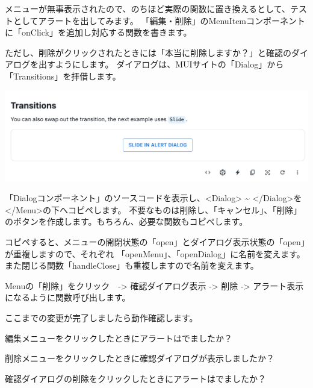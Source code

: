 メニューが無事表示されたので、のちほど実際の関数に置き換えるとして、テストとしてアラートを出してみます。
「編集・削除」のMenuItemコンポーネントに「onClick」を追加し対応する関数を書きます。

\vspace*{\baselineskip}

ただし、削除がクリックされたときには「本当に削除しますか？」と確認のダイアログを出すようにします。
ダイアログは、MUIサイトの「Dialog」から「Transitions」を拝借します。

\begin{reviewimage}[H]%
\includegraphics[width=0.6\maxwidth]{./images/03-todo-with-react/mui013-card-deleteDialog.png}%
\label{image:03-todo-with-react:mui013-card-deleteDialog}
\end{reviewimage}
\vspace*{\baselineskip}

「Dialogコンポーネント」のソースコードを表示し、\textless{}Dialog\textgreater{} \textasciitilde{} \textless{}/Dialog\textgreater{}を\textless{}/Menu\textgreater{}の下へコピペします。
不要なものは削除し、「キャンセル」、「削除」のボタンを作成します。もちろん、必要な関数もコピペします。

\vspace*{\baselineskip}

コピペすると、メニューの開閉状態の「open」とダイアログ表示状態の「open」が重複しますので、それぞれ
「openMenu」、「openDialog」に名前を変えます。また閉じる関数「handleClose」も重複しますので名前を変えます。

\vspace*{\baselineskip}

Menuの「削除」をクリック　{-}\textgreater{} 確認ダイアログ表示 {-}\textgreater{} 削除 {-}\textgreater{} アラート表示になるように関数呼び出します。

\vspace*{\baselineskip}

ここまでの変更が完了しましたら動作確認します。

\begin{starteritemize}
\item 編集メニューをクリックしたときにアラートはでましたか？
\item 削除メニューをクリックしたときに確認ダイアログが表示しましたか？
\item 確認ダイアログの削除をクリックしたときにアラートはでましたか？
\end{starteritemize}

